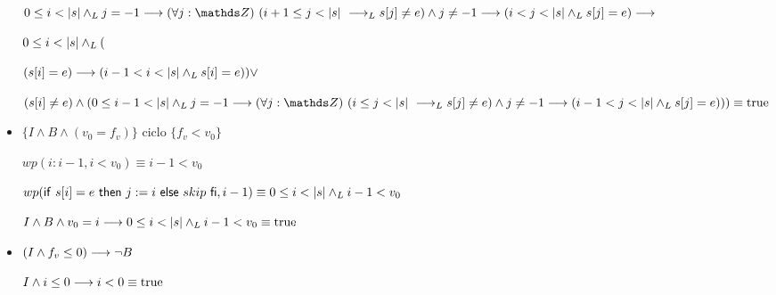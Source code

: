 \documentclass{article}
\begin{document}
\begin{itemize}
    $0 \leq i < \longitud{s} \yLuego j = -1 \implica \paraTodo{j}{(i+1}{\longitud{s}} \implicaLuego s[j] \neq e) \wedge j \neq -1 \implica (i < j < \longitud{s} \yLuego s[j]=e) \implica$

    $0 \leq i < |s| \land _L ( $
    
    $(s[i] = e) \longrightarrow (i-1 < i < |s| \land _L s[i]=e) ) \vee$

    $(s[i] \neq e) \wedge ( 0 \leq i-1 < \longitud{s} \yLuego j = -1 \implica \paraTodo{j}{(i}{\longitud{s}} \implicaLuego s[j] \neq e) \wedge j \neq -1 \implica (i-1 < j < \longitud{s} \yLuego s[j]=e))) \equiv \True$

    \item $\{I \wedge B \wedge (v_{0} = f_{v})\}$ ciclo $\{f_{v} < v_{0}\}$
    
    $wp(i:i-1, i<v_{0}) \equiv i-1<v_{0}$

    $wp(\mathsf{if}\ s[i]=e\ \mathsf{then}\ j:=i\ \mathsf{else}\ skip\ \mathsf{fi}, i-1) \equiv 0 \leq i < |s| \land _L i-1<v_{0}$

    $I \wedge B \wedge v_{0} = i \longrightarrow 0 \leq i < |s| \land _L i-1<v_{0} \equiv \mathrm{true}$

    \item $(I \wedge f_{v} \leq 0) \longrightarrow \neg B$

    $I \wedge i \leq 0 \longrightarrow i < 0 \equiv \mathrm{true}$
\end{itemize}
\end{document}
